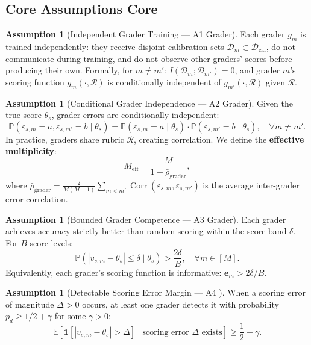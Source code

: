 \documentclass[11pt,a4paper]{article}
\theoremstyle{definition}
\newtheorem{assumption}[theorem]{Assumption}
\theoremstyle{remark}
\DeclareMathOperator{\Corr}{Corr}
\newcommand{\E}{\mathbb{E}}
\newcommand{\Pbb}{\mathbb{P}}
\newcommand{\ind}[1]{\mathbf{1}[#1]}
\newcommand{\cD}{\mathcal{D}}
\newcommand{\cR}{\mathcal{R}}
\newcommand{\rubric}{\cR}
\newcommand{\trueScore}{\theta}
\newcommand{\expertiseVec}{\mathbf{e}}
\begin{document}
\subsection{Core Assumptions Core}
\begin{assumption}[Independent Grader Training — A1 Grader]
\label{asm:A1_edu}
Each grader $g_m$ is trained independently: they receive disjoint calibration sets $\cD_m \subset \cD_{\text{cal}}$, do not communicate during training, and do not observe other graders' scores before producing their own. Formally, for $m \neq m'$: $I(\cD_m; \cD_{m'}) = 0$, and grader $m$'s scoring function $g_m(\cdot, \rubric)$ is conditionally independent of $g_{m'}(\cdot, \rubric)$ given $\rubric$.
\end{assumption}
\begin{assumption}[Conditional Grader Independence — A2 Grader]
\label{asm:A2_edu}
Given the true score $\trueScore_s$, grader errors are conditionally independent:
\begin{equation}
    \Pbb(\varepsilon_{s,m} = a, \varepsilon_{s,m'} = b \mid \trueScore_s) = \Pbb(\varepsilon_{s,m} = a \mid \trueScore_s) \cdot \Pbb(\varepsilon_{s,m'} = b \mid \trueScore_s), \quad \forall m \neq m'.
\end{equation}
In practice, graders share rubric $\rubric$, creating correlation. We define the \textbf{effective multiplicity}:
\begin{equation}
    M_{\text{eff}} = \frac{M}{1 + \bar{\rho}_{\text{grader}}},
\end{equation}
where $\bar{\rho}_{\text{grader}} = \frac{2}{M(M-1)}\sum_{m<m'}\Corr(\varepsilon_{s,m}, \varepsilon_{s,m'})$ is the average inter-grader error correlation.
\end{assumption}
\begin{assumption}[Bounded Grader Competence — A3 Grader]
\label{asm:A3_edu}
Each grader achieves accuracy strictly better than random scoring within the score band $\delta$. For $B$ score levels:
\begin{equation}
    \Pbb(|v_{s,m} - \trueScore_s| \le \delta \mid \trueScore_s) > \frac{2\delta}{B}, \quad \forall m \in [M].
\end{equation}
Equivalently, each grader's scoring function is informative: $\expertiseVec_m > 2\delta/B$.
\end{assumption}
\begin{assumption}[Detectable Scoring Error Margin — A4 ]
\label{asm:A4_edu}
When a scoring error of magnitude $\Delta > 0$ occurs, at least one grader detects it with probability $p_d \ge 1/2 + \gamma$ for some $\gamma > 0$:
\begin{equation}
    \E[\ind{|v_{s,m} - \trueScore_s| > \Delta} \mid \text{scoring error } \Delta \text{ exists}] \ge \frac{1}{2} + \gamma.
\end{equation}
\end{assumption}
\end{document}
